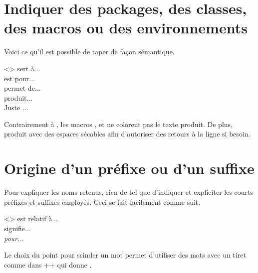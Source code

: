 \documentclass{../main/main}
\begin{document}
\section{Indiquer des packages, des classes, des macros ou des environnements}

Voici ce qu'il est possible de taper de façon sémantique.


\begin{tdoclatex}<>
 sert à...      \\
 est pour... \\
 permet de... \\
 produit...          \\
Juste ...
\end{tdoclatex}


\begin{tdocrem}
    Contrairement à , les macros ,  et  ne colorent pas le texte produit.
    De plus,  produit  avec des espaces sécables afin d'autoriser des retours à la ligne si besoin.
\end{tdocrem}



\section{Origine d'un préfixe ou d'un suffixe}

Pour expliquer les noms retenus, rien de tel que d'indiquer et expliciter les courts préfixes et suffixes employés. Ceci se fait facilement comme suit.


\begin{tdoclatex}<>
 est relatif à...     \\
 signifie...  \\
\emph{ pour...}
\end{tdoclatex}


\begin{tdocrem}
    Le choix du point pour scinder un mot permet d'utiliser des mots avec un tiret comme dans \tdoclatexin++ qui donne .
\end{tdocrem}
\end{document}
